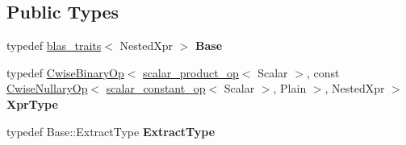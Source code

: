 \subsection*{Public Types}
\begin{DoxyCompactItemize}
\item 
\mbox{\label{struct_eigen_1_1internal_1_1blas__traits_3_01_cwise_binary_op_3_01scalar__product__op_3_01_scala460c90a32ed86eb7afe907bd9f50947d_ab030a244ed57b83a807dca5df86293e9}} 
typedef \mbox{\hyperlink{struct_eigen_1_1internal_1_1blas__traits}{blas\+\_\+traits}}$<$ Nested\+Xpr $>$ {\bfseries Base}
\item 
\mbox{\label{struct_eigen_1_1internal_1_1blas__traits_3_01_cwise_binary_op_3_01scalar__product__op_3_01_scala460c90a32ed86eb7afe907bd9f50947d_a8dfb9e865bf366a17916271313d00f2e}} 
typedef \mbox{\hyperlink{class_eigen_1_1_cwise_binary_op}{Cwise\+Binary\+Op}}$<$ \mbox{\hyperlink{struct_eigen_1_1internal_1_1scalar__product__op}{scalar\+\_\+product\+\_\+op}}$<$ Scalar $>$, const \mbox{\hyperlink{class_eigen_1_1_cwise_nullary_op}{Cwise\+Nullary\+Op}}$<$ \mbox{\hyperlink{struct_eigen_1_1internal_1_1scalar__constant__op}{scalar\+\_\+constant\+\_\+op}}$<$ Scalar $>$, Plain $>$, Nested\+Xpr $>$ {\bfseries Xpr\+Type}
\item 
\mbox{\label{struct_eigen_1_1internal_1_1blas__traits_3_01_cwise_binary_op_3_01scalar__product__op_3_01_scala460c90a32ed86eb7afe907bd9f50947d_a3b78ae427bd972407c5ee568b3d55089}} 
typedef Base\+::\+Extract\+Type {\bfseries Extract\+Type}
\end{DoxyCompactItemize}
